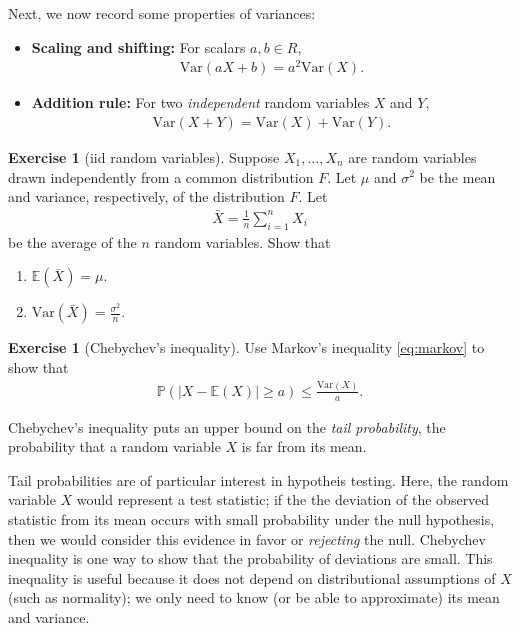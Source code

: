 \documentclass[11pt]{article}
\theoremstyle{definition}
\newtheorem{exercise}[]{Exercise}
\renewcommand{\P}{\mathbb{P}}
\newcommand{\E}{\mathbb{E}}
\newcommand{\V}{\text{Var}}
\begin{document}
Next, we now record some properties of variances:
\begin{itemize}
  \item {\bf Scaling and shifting: } For scalars $a, b\in R$,
  \begin{align*}
    \V(aX + b) = a^2\V(X).
  \end{align*}
  \item {\bf Addition rule: } For two \textit{independent}
  random variables $X$ and $Y$,
  \begin{align*}
    \V(X + Y) = \V(X) + \V(Y).
  \end{align*}
\end{itemize}

\begin{exercise}[iid random variables]
  Suppose $X_1,..., X_n$ are random variables drawn independently from a
  common distribution $F$. Let $\mu$ and $\sigma^2$ be the mean and variance,
  respectively, of the distribution $F$. Let
  \begin{align*}
    \bar{X} = \frac{1}{n} \sum_{i=1}^n X_i
  \end{align*}
  be the average of the $n$ random variables. Show that

  \begin{enumerate}[label = (\alph*)]
    \item $\E(\bar{X}) = \mu$.
    \item $\V(\bar{X}) = \frac{\sigma^2}{n}$.
  \end{enumerate}
\end{exercise}

\begin{exercise}[Chebychev's inequality]
  Use Markov's inequality \eqref{eq:markov} to show that
  \begin{align*}
    \P(|X - \E(X)| \geq a) \leq \frac{\V(X)}{a}.
  \end{align*}
\end{exercise}

Chebychev's inequality puts an upper bound on the \textit{tail probability},
the probability that a random variable $X$ is far from its mean.

Tail probabilities are of particular interest in hypotheis testing.
Here, the random variable $X$ would represent a test statistic;
if the the deviation of the observed statistic from its mean occurs with small probability under
the null hypothesis,
then we would consider this evidence in favor or \textit{rejecting} the null.
Chebychev inequality is one way to show that the probability of deviations are small.
This inequality is useful because it does not depend on distributional assumptions of $X$
(such as normality); we only need to know (or be able to approximate) its mean and variance.
\end{document}
